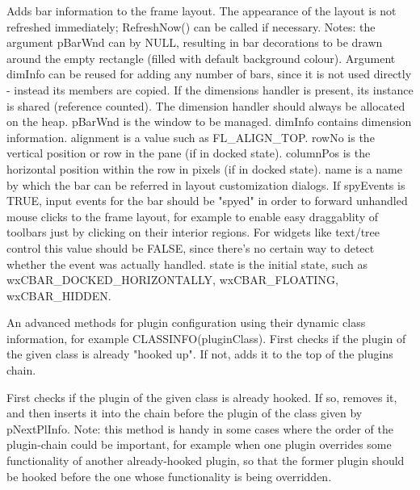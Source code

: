 Adds bar information to the frame layout. The appearance of the layout is not refreshed
immediately; RefreshNow() can be called if necessary.
Notes: the argument pBarWnd can by NULL, resulting in bar decorations to be drawn
around the empty rectangle (filled with default background colour).
Argument dimInfo can be reused for adding any number of bars, since
it is not used directly - instead its members are copied. If the dimensions
handler is present, its instance is shared (reference counted). The dimension
handler should always be allocated on the heap.
pBarWnd is the window to be managed.
dimInfo contains dimension information.
alignment is a value such as FL\_ALIGN\_TOP.
rowNo is the vertical position or row in the pane (if in docked state).
columnPos is the horizontal position within the row in pixels (if in docked state).
name is a name by which the bar can be referred in layout customization dialogs.
If spyEvents is TRUE, input events for the bar should be "spyed" in order
to forward unhandled mouse clicks to the frame layout, for example to enable
easy draggablity of toolbars just by clicking on their interior regions.
For widgets like text/tree control this value should be FALSE,
since there's no certain way to detect  whether the event was actually handled.
state is the initial state, such as wxCBAR\_DOCKED\_HORIZONTALLY,
wxCBAR\_FLOATING, wxCBAR\_HIDDEN.


\label{wxframelayoutaddplugin}


An advanced methods for plugin configuration    using their
dynamic class information, for example CLASSINFO(pluginClass).
First checks if the plugin of the given class is already "hooked up".
If not, adds it to the top of the plugins chain.


\label{wxframelayoutaddpluginbefore}


First checks if the plugin of the given class is already hooked.
If so, removes it, and then inserts it into the chain
before the plugin of the class given by pNextPlInfo.
Note: this method is handy in some cases where the order
of the plugin-chain could be important, for example when one plugin overrides
some functionality of another already-hooked plugin,
so that the former plugin should be hooked before the one
whose functionality is being overridden.


